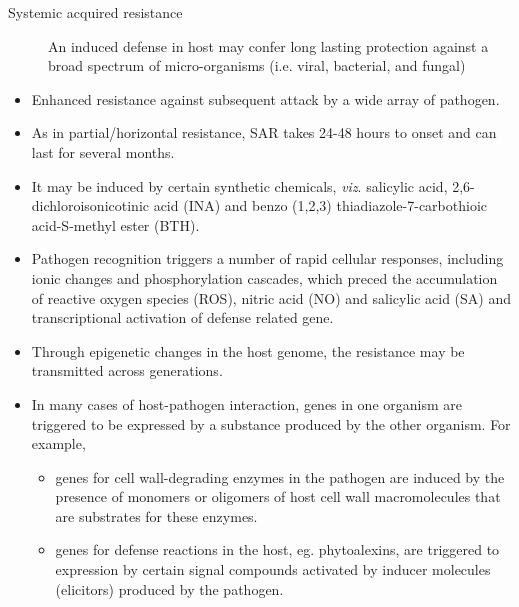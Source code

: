 \documentclass[11pt,dvipsnames,ignorenonframetext,aspectratio=169]{beamer}
\providecommand{\tightlist}{%
  \setlength{\itemsep}{0pt}\setlength{\parskip}{0pt}}
\begin{document}
\begin{frame}{}
\protect\hypertarget{section-2}{}
\begin{description}
\item[Systemic acquired resistance] An induced defense in host may confer long lasting protection against a broad spectrum of micro-organisms (i.e. viral, bacterial, and fungal)
\end{description}

\begin{itemize}
\tightlist
\item
  Enhanced resistance against subsequent attack by a wide array of
  pathogen.
\item
  As in partial/horizontal resistance, SAR takes 24-48 hours to onset
  and can last for several months.
\item
  It may be induced by certain synthetic chemicals, \emph{viz}.
  salicylic acid, 2,6-dichloroisonicotinic acid (INA) and benzo (1,2,3)
  thiadiazole-7-carbothioic acid-S-methyl ester (BTH).
\item
  Pathogen recognition triggers a number of rapid cellular responses,
  including ionic changes and phosphorylation cascades, which preced the
  accumulation of reactive oxygen species (ROS), nitric acid (NO) and
  salicylic acid (SA) and transcriptional activation of defense related
  gene.
\item
  Through epigenetic changes in the host genome, the resistance may be
  transmitted across generations.
\end{itemize}
\end{frame}

\begin{frame}{}
\protect\hypertarget{section-3}{}
\begin{itemize}
\tightlist
\item
  In many cases of host-pathogen interaction, genes in one organism are
  triggered to be expressed by a substance produced by the other
  organism. For example,

  \begin{itemize}
  \tightlist
  \item
    genes for cell wall-degrading enzymes in the pathogen are induced by
    the presence of monomers or oligomers of host cell wall
    macromolecules that are substrates for these enzymes.
  \item
    genes for defense reactions in the host, eg. phytoalexins, are
    triggered to expression by certain signal compounds activated by
    inducer molecules (elicitors) produced by the pathogen.
  \end{itemize}
\end{itemize}
\end{frame}
\end{document}
